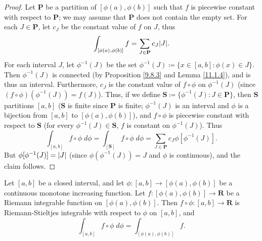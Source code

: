 \begin{proof}
    Let \(\mathbf{P}\) be a partition of \([\phi(a), \phi(b)]\) such that \(f\) is piecewise constant with respect to \(\mathbf{P}\);
    we may assume that \(\mathbf{P}\) does not contain the empty set.
    For each \(J \in \mathbf{P}\), let \(c_J\) be the constant value of \(f\) on \(J\), thus
    \[
        \int_{[\phi(a), \phi(b)]} f = \sum_{J \in \mathbf{P}} c_J \abs*{J}.
    \]
    For each interval \(J\), let \(\phi^{-1}(J)\) be the set \(\phi^{-1}(J) \coloneqq \{x \in [a, b] : \phi(x) \in J\}\).
    Then \(\phi^{-1}(J)\) is connected (by Proposition \ref{9.8.3} and Lemma \ref{11.1.4}), and is thus an interval.
    Furthermore, \(c_J\) is the constant value of \(f \circ \phi\) on \(\phi^{-1}(J)\) (since \((f \circ \phi)(\phi^{-1}(J)) = f(J)\)).
    Thus, if we define \(\mathbf{S} \coloneqq \{\phi^{-1} (J) : J \in \mathbf{P}\}\), then \(\mathbf{S}\) partitions \([a, b]\)
    (\(\mathbf{S}\) is finite since \(\mathbf{P}\) is finite;
    \(\phi^{-1}(J)\) is an interval and \(\phi\) is a bijection from \([a, b]\) to \([\phi(a), \phi(b)]\)),
    and \(f \circ \phi\) is piecewise constant with respect to \(\mathbf{S}\) (for every \(\phi^{-1}(J) \in \mathbf{S}\), \(f\) is constant on \(\phi^{-1}(J)\)).
    Thus
    \[
        \int_{[a, b]} f \circ \phi \; d \phi = \int_{[\mathbf{S}]} f \circ \phi \; d \phi = \sum_{J \in \mathbf{P}} c_J \phi[\phi^{-1}(J)].
    \]
    But \(\phi[\phi^{-1}(J)] = \abs*{J}\) (since \(\phi(\phi^{-1}(J)) = J\) and \(\phi\) is continuous), and the claim follows.
\end{proof}

\begin{proposition}\label{11.10.6}
    Let \([a, b]\) be a closed interval, and let \(\phi : [a, b] \to [\phi(a), \phi(b)]\) be a continuous monotone increasing function.
    Let \(f : [\phi(a), \phi(b)] \to \mathbf{R}\) be a Riemann integrable function on \([\phi(a), \phi(b)]\).
    Then \(f \circ \phi : [a, b] \to \mathbf{R}\) is Riemann-Stieltjes integrable with respect to \(\phi\) on \([a, b]\), and
    \[
        \int_{[a, b]} f \circ \phi \; d \phi = \int_{[\phi(a), \phi(b)]} f.
    \]
\end{proposition}

